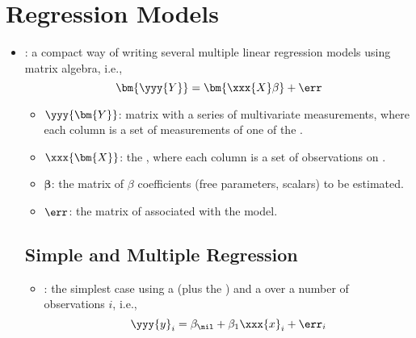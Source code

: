 \section{Regression Models}
\begin{itemize}
  \item {}: a compact way of writing several multiple linear regression models using matrix algebra, i.e.,
  \[%
  \bm{\yyy{Y}} = \bm{\xxx{X}\beta} + \err
  \]%
  \begin{itemize}
    \item \(\yyy{\bm{Y}}\): matrix with a series of multivariate measurements, where each column is a set of measurements of one of the .
    \item \(\xxx{\bm{X}}\): the , where each column is a set of observations on .
    \item \(\bm{\beta}\): the matrix of \(\beta \) coefficients (free parameters, scalars) to be estimated.
    \item \(\displaystyle\err\): the matrix of  associated with the model.
  \end{itemize}
  
  \subsection{Simple and Multiple Regression}
  \begin{itemize}
    \item {}: the simplest case using a  (plus the \hyperref[Subsection: Model-Fitting]{}) and a  over a number of observations \(i\), i.e.,
    \[%
    \yyy{y}_i = \beta_\nil + \beta_1\xxx{x}_i + \err_i
    \]%
    

\end{itemize}
\end{itemize}
